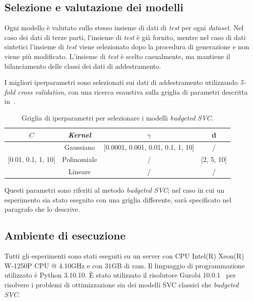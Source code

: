 \subsection{Selezione e valutazione dei modelli}
Ogni modello è valutato sullo stesso insieme di dati di \emph{test} per ogni \emph{dataset}.
Nel caso dei dati di terze parti, l'insieme di \emph{test} è già fornito, mentre nel caso di dati sintetici l'insieme di \emph{test} viene selezionato dopo la procedura di generazione e non viene più modificato.
L'insieme di \emph{test} è scelto casualmente, ma mantiene il bilanciamento delle classi dei dati di addestramento.

I migliori iperparametri sono selezionati sui dati di addestramento utilizzando \emph{5-fold cross validation}, con una ricerca esaustiva sulla griglia di parametri descritta in~.
\begin{table}
    \centering
    \begin{tabular}{cccc}
        \toprule
        $C$ & \emph{Kernel} & $\gamma$ & d \\
        \midrule
        \multirow{3}{*}{[0.01, 0.1, 1, 10]} & Gaussiano   & [0.0001, 0.001, 0.01, 0.1, 1, 10]   & /\\
                                            \cline{2-4}
                                            & Polinomiale   & / & [2, 5, 10] \\
                                            \cline{2-4}
                                            & Lineare       & / & / \\
        \bottomrule
    \end{tabular}
    \caption{Griglia di iperparametri per selezionare i modelli \emph{budgeted SVC}.}
    \label{tab:gridsearch_2d}
\end{table}
Questi parametri sono riferiti al metodo \emph{budgeted SVC}; nel caso in cui un esperimento sia stato eseguito con una griglia differente, sarà specificato nel paragrafo che lo descrive.

\subsection{Ambiente di esecuzione}
Tutti gli esperimenti sono stati eseguiti su un server con CPU Intel(R) Xeon(R) W-1250P CPU @ 4.10GHz e con 31GB di ram. Il linguaggio di programmazione utilizzato è Python 3.10.10. \`E stato utilizzato il risolutore Gurobi 10.0.1~\cite{gurobi} per risolvere i problemi di ottimizzazione sia dei modelli SVC classici che \emph{budgeted SVC}.

